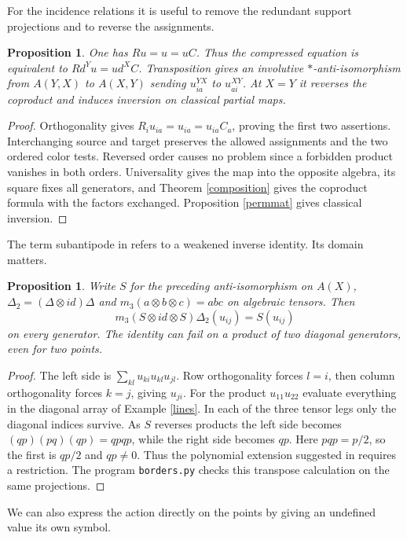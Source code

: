 \documentclass[11pt,a4paper]{article}
\newtheorem{prop}[thm]{Proposition}
\begin{document}
For the incidence relations it is useful to remove the redundant support projections and to reverse the assignments.

\begin{prop}\label{transpose}
One has $Ru=u=uC$. Thus the compressed equation is equivalent to $Rd^Yu=ud^XC$. Transposition gives an involutive $*$-anti-isomorphism from $A(Y,X)$ to $A(X,Y)$ sending $u^{YX}_{ia}$ to $u^{XY}_{ai}$. At $X=Y$ it reverses the coproduct and induces inversion on classical partial maps.
\end{prop}
\begin{proof}
Orthogonality gives $R_i u_{ia}=u_{ia}=u_{ia}C_a$, proving the first two assertions. Interchanging source and target preserves the allowed assignments and the two ordered color tests. Reversed order causes no problem since a forbidden product vanishes in both orders. Universality gives the map into the opposite algebra, its square fixes all generators, and Theorem \ref{composition} gives the coproduct formula with the factors exchanged. Proposition \ref{permmat} gives classical inversion.
\end{proof}

The term subantipode in \cite{bs} refers to a weakened inverse identity. Its domain matters.

\begin{prop}\label{subinverse}
Write $S$ for the preceding anti-isomorphism on $A(X)$, $\Delta_2=(\Delta\otimes id)\Delta$ and $m_3(a\otimes b\otimes c)=abc$ on algebraic tensors. Then
\[
 m_3(S\otimes id\otimes S)\Delta_2(u_{ij})=S(u_{ij})
\]
on every generator. The identity can fail on a product of two diagonal generators, even for two points.
\end{prop}
\begin{proof}
The left side is $\sum_{kl}u_{ki}u_{kl}u_{jl}$. Row orthogonality forces $l=i$, then column orthogonality forces $k=j$, giving $u_{ji}$. For the product $u_{11}u_{22}$ evaluate everything in the diagonal array of Example \ref{lines}. In each of the three tensor legs only the diagonal indices survive. As $S$ reverses products the left side becomes $(qp)(pq)(qp)=qpqp$, while the right side becomes $qp$. Here $pqp=p/2$, so the first is $qp/2$ and $qp\ne0$. Thus the polynomial extension suggested in \cite{bs} requires a restriction. The program \texttt{borders.py} checks this transpose calculation on the same projections.
\end{proof}

We can also express the action directly on the points by giving an undefined value its own symbol.
\end{document}
